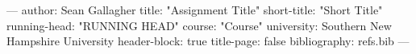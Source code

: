 ---
author: Sean Gallagher
title: "Assignment Title"
short-title: "Short Title"
running-head: "RUNNING HEAD"
course: "Course"
university: Southern New Hampshire University
header-block: true
title-page: false
bibliography: refs.bib
---
